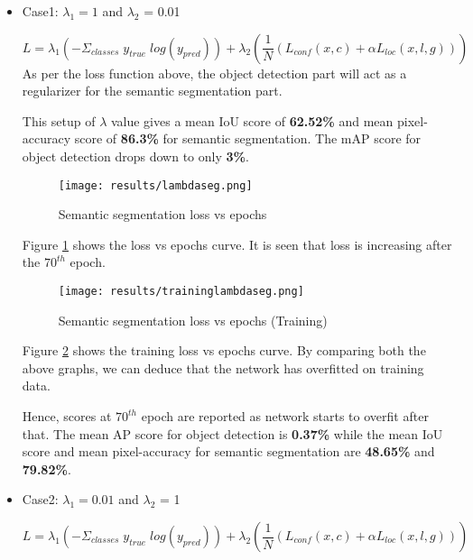 \begin{itemize}
\item Case1: $\lambda_{1}=1$ and $\lambda_{2}$ = 0.01
    
\begin{equation}
    L = \lambda_{1} (-\Sigma_{classes}\;y_{true}\;log(y_{pred})) + \lambda_{2}(\frac{1}{N} (L_{conf} (x,c) + \alpha L_{loc} (x,l,g))) 
\end{equation}
As per the loss function above, the object detection part will act as a regularizer for the semantic segmentation part. 

\par

This setup of $\lambda$ value gives a mean IoU score of \textbf{62.52\%} and mean pixel-accuracy score of \textbf{86.3\%} for semantic segmentation. The mAP score for object detection drops down to only \textbf{3\%}.

\par

\begin{figure}[h!]
    \centering
    \texttt{[image: results/lambdaseg.png]}
    \caption{Semantic segmentation loss vs epochs}
    \label{labdaseg}
\end{figure}

Figure \ref{labdaseg} shows the loss vs epochs curve. It is seen that loss is increasing after the $70^{th}$ epoch.


\begin{figure}
\centering
    \texttt{[image: results/traininglambdaseg.png]}
    \caption{Semantic segmentation loss vs epochs (Training)}
    \label{labdasegtraining}
\end{figure}

Figure \ref{labdasegtraining} shows the training loss vs epochs curve. By comparing both the above graphs, we can deduce that the network has overfitted on training data. 

\newpage

Hence, scores at $70^{th}$ epoch are reported as network starts to overfit after that. The mean
AP score for object detection is \textbf{0.37\%} while the mean IoU score and mean pixel-accuracy for semantic segmentation are \textbf{48.65\%} and \textbf{79.82\%}. 


\item Case2: $\lambda_{1}=0.01$ and $\lambda_{2}$ = 1

\begin{equation}
    L = \lambda_{1} (-\Sigma_{classes}\;y_{true}\;log(y_{pred})) + \lambda_{2}(\frac{1}{N} (L_{conf} (x,c) + \alpha L_{loc} (x,l,g))) 
\end{equation}


\end{itemize}
